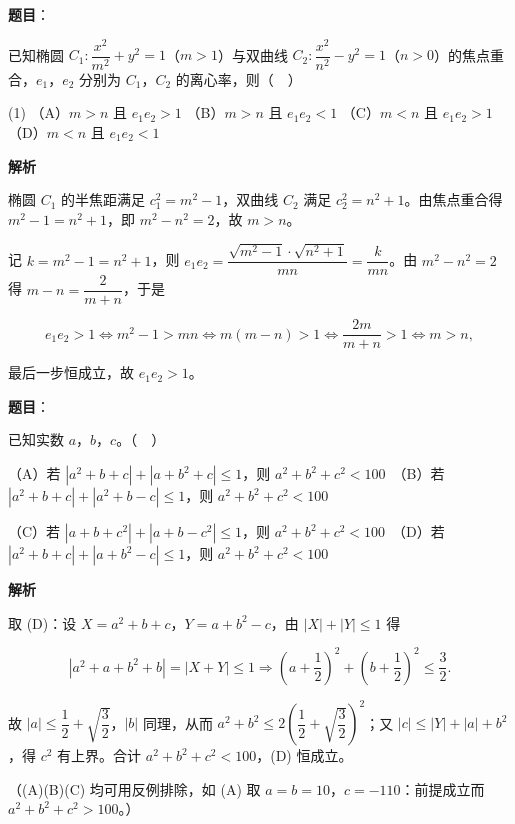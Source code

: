 \begin{answer}

\textbf{题目}：

已知椭圆 \(C_{1}:\dfrac{x^{2}}{m^{2}}+y^{2}=1\)（\(m>1\)）与双曲线 \(C_{2}:\dfrac{x^{2}}{n^{2}}-y^{2}=1\)（\(n>0\)）的焦点重合，\(e_{1}\)，\(e_{2}\) 分别为 \(C_{1}\)，\(C_{2}\) 的离心率，则（　）

\begin{gkopts}(1)
\task （A）\(m>n\) 且 \(e_{1}e_{2}>1\)
\task （B）\(m>n\) 且 \(e_{1}e_{2}<1\)
\task （C）\(m<n\) 且 \(e_{1}e_{2}>1\)
\task （D）\(m<n\) 且 \(e_{1}e_{2}<1\)
\end{gkopts}

\textbf{解析}

椭圆 \(C_{1}\) 的半焦距满足 \(c_{1}^{2}=m^{2}-1\)，双曲线 \(C_{2}\) 满足 \(c_{2}^{2}=n^{2}+1\)。由焦点重合得 \(m^{2}-1=n^{2}+1\)，即 \(m^{2}-n^{2}=2\)，故 \(m>n\)。

记 \(k=m^{2}-1=n^{2}+1\)，则 \(e_{1}e_{2}=\dfrac{\sqrt{m^{2}-1}\cdot\sqrt{n^{2}+1}}{mn}=\dfrac{k}{mn}\)。由 \(m^{2}-n^{2}=2\) 得 \(m-n=\dfrac{2}{m+n}\)，于是

\nopagebreak[4]
\[
e_{1}e_{2}>1\iff m^{2}-1>mn\iff m(m-n)>1\iff\dfrac{2m}{m+n}>1\iff m>n,
\]

最后一步恒成立，故 \(e_{1}e_{2}>1\)。


\end{answer}
\begin{answer}

\textbf{题目}：

已知实数 \(a\)，\(b\)，\(c\)。（　）

（A）若 \(|a^{2}+b+c|+|a+b^{2}+c|\leqslant 1\)，则 \(a^{2}+b^{2}+c^{2}<100\)　（B）若 \(|a^{2}+b+c|+|a^{2}+b-c|\leqslant 1\)，则 \(a^{2}+b^{2}+c^{2}<100\)

（C）若 \(|a+b+c^{2}|+|a+b-c^{2}|\leqslant 1\)，则 \(a^{2}+b^{2}+c^{2}<100\)　（D）若 \(|a^{2}+b+c|+|a+b^{2}-c|\leqslant 1\)，则 \(a^{2}+b^{2}+c^{2}<100\)

\textbf{解析}

取 (D)：设 \(X=a^{2}+b+c\)，\(Y=a+b^{2}-c\)，由 \(|X|+|Y|\leqslant 1\) 得

\nopagebreak[4]
\[
|a^{2}+a+b^{2}+b|=|X+Y|\leqslant 1\Longrightarrow\left(a+\dfrac{1}{2}\right)^{2}+\left(b+\dfrac{1}{2}\right)^{2}\leqslant\dfrac{3}{2}.
\]

故 \(|a|\leqslant\dfrac{1}{2}+\sqrt{\dfrac{3}{2}}\)，\(|b|\) 同理，从而 \(a^{2}+b^{2}\leqslant 2\left(\dfrac{1}{2}+\sqrt{\dfrac{3}{2}}\right)^{2}\)；又 \(|c|\leqslant|Y|+|a|+b^{2}\)，得 \(c^{2}\) 有上界。合计 \(a^{2}+b^{2}+c^{2}<100\)，(D) 恒成立。

（(A)(B)(C) 均可用反例排除，如 (A) 取 \(a=b=10\)，\(c=-110\)：前提成立而 \(a^{2}+b^{2}+c^{2}>100\)。）


\end{answer}
